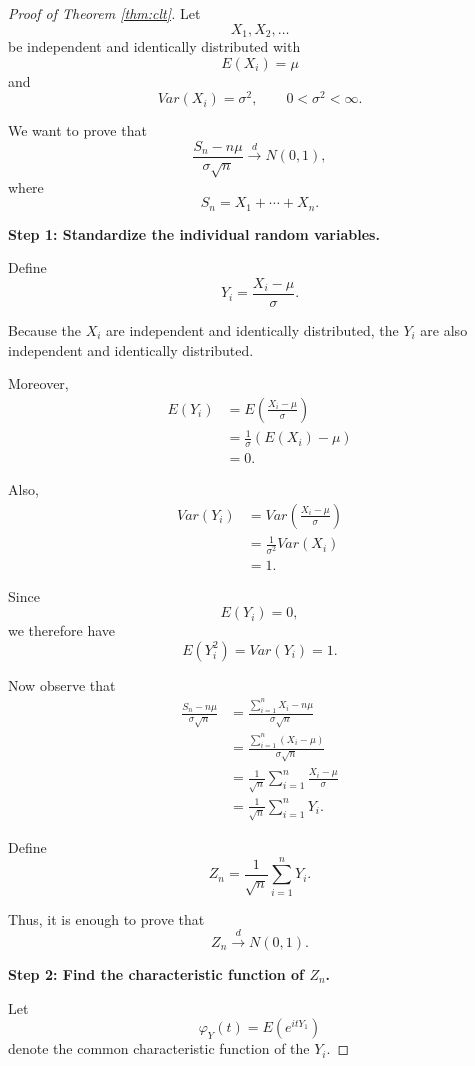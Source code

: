 \documentclass[11pt]{article}
\theoremstyle{definition}
\theoremstyle{plain}
\theoremstyle{remark}
\begin{document}
\begin{proof}[Proof of Theorem \ref{thm:clt}]
Let
\[
X_1,X_2,\ldots
\]
be independent and identically distributed with
\[
E(X_i)=\mu
\]
and
\[
Var(X_i)=\sigma^2,
\qquad
0<\sigma^2<\infty.
\]

We want to prove that
\[
\frac{S_n-n\mu}{\sigma\sqrt{n}}
\xrightarrow{d}
N(0,1),
\]
where
\[
S_n=X_1+\cdots+X_n.
\]

\medskip

\noindent
\textbf{Step 1: Standardize the individual random variables.}

Define
\[
Y_i
=
\frac{X_i-\mu}{\sigma}.
\]

Because the $X_i$ are independent and identically distributed, the
$Y_i$ are also independent and identically distributed.

Moreover,
\begin{align*}
E(Y_i)
&=
E\left(
\frac{X_i-\mu}{\sigma}
\right)
\\
&=
\frac{1}{\sigma}
\left(E(X_i)-\mu\right)
\\
&=
0.
\end{align*}

Also,
\begin{align*}
Var(Y_i)
&=
Var\left(
\frac{X_i-\mu}{\sigma}
\right)
\\
&=
\frac{1}{\sigma^2}Var(X_i)
\\
&=
1.
\end{align*}

Since
\[
E(Y_i)=0,
\]
we therefore have
\[
E(Y_i^2)
=
Var(Y_i)
=
1.
\]

Now observe that
\begin{align*}
\frac{S_n-n\mu}{\sigma\sqrt{n}}
&=
\frac{
\sum_{i=1}^n X_i-n\mu
}{
\sigma\sqrt{n}
}
\\
&=
\frac{
\sum_{i=1}^n(X_i-\mu)
}{
\sigma\sqrt{n}
}
\\
&=
\frac{1}{\sqrt{n}}
\sum_{i=1}^n
\frac{X_i-\mu}{\sigma}
\\
&=
\frac{1}{\sqrt{n}}
\sum_{i=1}^nY_i.
\end{align*}

Define
\[
Z_n
=
\frac{1}{\sqrt{n}}
\sum_{i=1}^nY_i.
\]

Thus, it is enough to prove that
\[
Z_n\xrightarrow{d}N(0,1).
\]

\medskip

\noindent
\textbf{Step 2: Find the characteristic function of $Z_n$.}

Let
\[
\varphi_Y(t)
=
E(e^{itY_1})
\]
denote the common characteristic function of the $Y_i$.


\end{proof}
\end{document}
